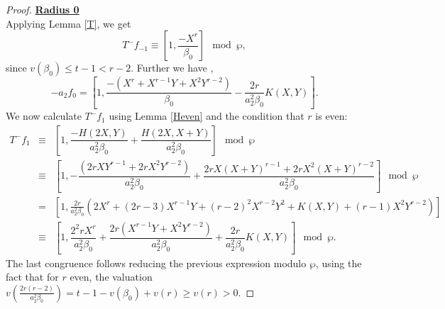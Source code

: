 \documentclass[10pt,a4paper]{amsart}
\begin{document}
\begin{proof}
\noindent\underline{\textbf{Radius 0}}\\
 Applying Lemma \ref{T}, we get %
\begin{equation}\label{F2'T-f-1}
    T^{-}f_{-1} \equiv 
        \left[1, \dfrac{-X^r}{\beta_{0}}\right]\mod\wp,
\end{equation}
since $v(\beta_0)\leq t-1<r-2$.
Further we have ,
\begin{equation}\label{F2'a2f0}
 -a_{2}f_{0} = \left[1, \dfrac{-\left(X^{r}+X^{r-1}Y+X^{2}Y^{r-2}\right)}{\beta_{0}} -\dfrac{2r}{a_{2}^2\beta_{0}}K(X,Y) \right].
 \end{equation}
We now calculate $T^{-}f_{1}$ using Lemma \ref{Heven} and the condition that $r$ is even:
\begin{eqnarray}\label{F2'T-f1}      T^{-}f_1 &\equiv& \left[1, \dfrac{-H(2X,Y)}{a_{2}^2\beta_{0}}+\dfrac{H(2X,X+Y)}{a_{2}^2\beta_{0}}\right] \mod \wp \nonumber\\
    &\equiv&  \left[1, -\dfrac{(2rXY^{r-1}+2r    X^{2}Y^{r-2})}{a_{2}^2\beta_{0}}+\dfrac{2rX(X+Y)^{r-1}+2rX^{2}(X+Y)^{r-2}} {a_{2}^2\beta_{0}}\right]\mod\wp \nonumber\\
    &=&\left[1, \frac{2r}{a_2^2\beta_0}\left(2X^r+(2r-3)X^{r-1}Y+(r-2)^2X^{r-2}Y^2+K(X,Y)+(r-1)X^2Y^{r-2}\right)\right] \nonumber\\
    &\equiv&\left[1, \dfrac{2^2rX^r}{a_{2}^2\beta_{0}} + \dfrac{2r(X^{r-1}Y+X^{2}Y^{r-2})}{a_{2}^2\beta_{0}}+\dfrac{2r}{a_{2}^2\beta_{0}}K(X,Y)\right]\mod\wp.
\end{eqnarray}
The last congruence follows reducing the previous expression modulo $\wp$, using the fact that for $r$ even, the valuation $v\left(\frac{2r(r-2)}{a_2^2\beta_0}\right)= t-1-v(\beta_0)+v(r)\geq v(r)>0$.



 


\end{proof}
\end{document}
